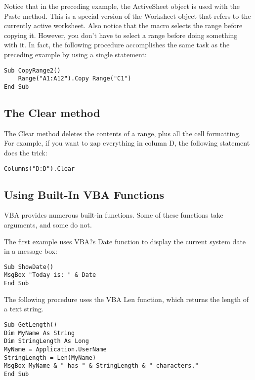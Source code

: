 \documentclass[
]{article}
\theoremstyle{definition}
\theoremstyle{definition}
\theoremstyle{definition}
\theoremstyle{definition}
\theoremstyle{remark}
\begin{document}
Notice that in the preceding example, the ActiveSheet object is used with the Paste method. This is a special version of the Worksheet object that refers to the currently active worksheet. Also notice that the macro selects the range before copying it. However, you don't have to select a range before doing something with it. In fact, the following
procedure accomplishes the same task as the preceding example by using a single statement:

\begin{verbatim}
Sub CopyRange2()
    Range("A1:A12").Copy Range("C1")
End Sub
\end{verbatim}

\hypertarget{the-clear-method}{%
\subsection{The Clear method}\label{the-clear-method}}

The Clear method deletes the contents of a range, plus all the cell
formatting. For example, if you want to zap everything in column D, the
following statement does the trick:

\begin{verbatim}
Columns("D:D").Clear
\end{verbatim}

\hypertarget{using-built-in-vba-functions}{%
\subsection{Using Built-In VBA Functions}\label{using-built-in-vba-functions}}

VBA provides numerous built-in functions. Some of these functions take
arguments, and some do not.

The first example uses VBA?s Date function to display the current system
date in a message box:

\begin{verbatim}
Sub ShowDate()
MsgBox "Today is: " & Date
End Sub
\end{verbatim}

The following procedure uses the VBA Len function, which returns the
length of a text string.

\begin{verbatim}
Sub GetLength()
Dim MyName As String
Dim StringLength As Long
MyName = Application.UserName
StringLength = Len(MyName)
MsgBox MyName & " has " & StringLength & " characters."
End Sub
\end{verbatim}
\end{document}
